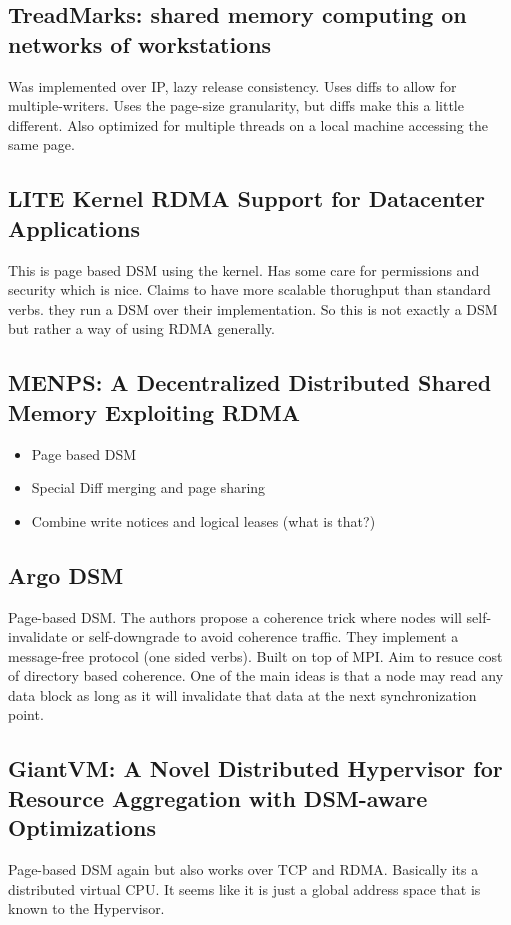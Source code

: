\documentclass[sigplan,nonacm]{acmart}
\begin{document}
    \subsection{TreadMarks: shared memory computing on networks of workstations}
    Was implemented over IP, lazy release consistency. Uses diffs to allow for multiple-writers. 
    Uses the page-size granularity, but diffs make this a little different. Also optimized for multiple threads
    on a local machine accessing the same page. \cite{Amza-Usenix-1994}

    \subsection{LITE Kernel RDMA Support for Datacenter Applications}
    This is page based DSM using the kernel. Has some care for permissions and security which is nice. 
    Claims to have more scalable thorughput than standard verbs. they run a DSM over their implementation.
    So this is not exactly a DSM but rather a way of using RDMA generally. \cite{Tsai-SOSP-2017}

    \subsection{MENPS: A Decentralized Distributed Shared Memory Exploiting RDMA} %
        \begin{itemize}
            \item Page based DSM
            \item Special Diff merging and page sharing
            \item Combine write notices and logical leases (what is that?)\cite{Endo-IPDRM-2020}
        \end{itemize}

    \subsection{Argo DSM} 
    Page-based DSM. The authors propose a coherence trick where nodes will self-invalidate 
    or self-downgrade to avoid coherence traffic. They implement a message-free protocol (one sided verbs). 
    Built on top of MPI. Aim to resuce cost of directory based coherence. One of the main ideas is that 
    a node may read any data block as long as it will invalidate that data at the next synchronization point. \cite{Kaxiras-HPDC-2015}

    \subsection {GiantVM: A Novel Distributed Hypervisor for Resource Aggregation with DSM-aware Optimizations}
    Page-based DSM again but also works over TCP and RDMA. Basically its a distributed virtual CPU. It seems like 
    it is just a global address space that is known to the Hypervisor.\cite{Jia-ACO-2022}
\end{document}
